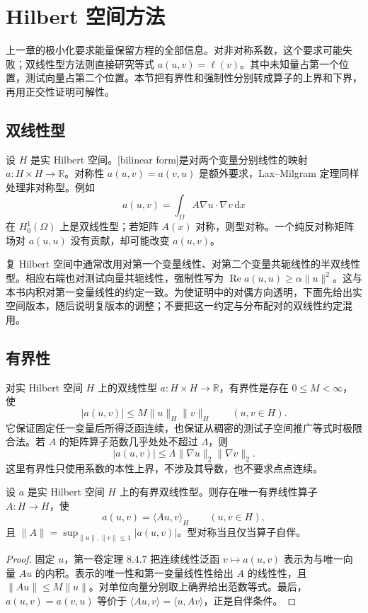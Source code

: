 \section{Hilbert 空间方法}
\label{b2:sec:1502}

上一章的极小化要求能量保留方程的全部信息。对非对称系数，这个要求可能失败；双线性型方法则直接研究等式 \(a(u,v)=\ell(v)\)。其中未知量占第一个位置，测试向量占第二个位置。本节把有界性和强制性分别转成算子的上界和下界，再用正交性证明可解性。

\subsection{双线性型}
\label{b2:subsec:150201}

设 \(H\) 是实 Hilbert 空间。[bilinear form]是对两个变量分别线性的映射 \(a:H\times H\to\mathbb R\)。对称性 \(a(u,v)=a(v,u)\) 是额外要求，Lax--Milgram 定理同样处理非对称型。例如
\[a(u,v)=\int_\Omega A\nabla u\cdot\nabla v\,\mathrm dx\]
在 \(H_0^1(\Omega)\) 上是双线性型；若矩阵 \(A(x)\) 对称，则型对称。一个纯反对称矩阵场对 \(a(u,u)\) 没有贡献，却可能改变 \(a(u,v)\)。

\ProseParagraphBreak

复 Hilbert 空间中通常改用对第一个变量线性、对第二个变量共轭线性的半双线性型。相应右端也对测试向量共轭线性，强制性写为 \(\operatorname{Re}a(u,u)\ge\alpha\lVert u\rVert^2\)。这与本书内积对第一变量线性的约定一致。为使证明中的对偶方向透明，下面先给出实空间版本，随后说明复版本的调整；不要把这一约定与分布配对的双线性约定混用。

\subsection{有界性}
\label{b2:subsec:150202}

对实 Hilbert 空间 \(H\) 上的双线性型 \(a:H\times H\to\mathbb R\)，有界性是存在 \(0\le M<\infty\)，使
\[|a(u,v)|\le M\lVert u\rVert_H\lVert v\rVert_H\qquad(u,v\in H).\]
它保证固定任一变量后所得泛函连续，也保证从稠密的测试子空间推广等式时极限合法。若 \(A\) 的矩阵算子范数几乎处处不超过 \(\Lambda\)，则
\[|a(u,v)|\le\Lambda\lVert\nabla u\rVert_2\lVert\nabla v\rVert_2.\]
这里有界性只使用系数的本性上界，不涉及其导数，也不要求点点连续。

\begin{proposition}[有界型的算子表示]
\label{b2:prop:15-form-operator}
设 \(a\) 是实 Hilbert 空间 \(H\) 上的有界双线性型。则存在唯一有界线性算子 \(A:H\to H\)，使
\[a(u,v)=\langle Au,v\rangle_H\qquad(u,v\in H),\]
且 \(\lVert A\rVert=\sup_{\lVert u\rVert,\lVert v\rVert\le1}|a(u,v)|\)。型对称当且仅当算子自伴。
\end{proposition}
\begin{proof}
固定 \(u\)，第一卷定理 8.4.7 把连续线性泛函 \(v\mapsto a(u,v)\) 表示为与唯一向量 \(Au\) 的内积。表示的唯一性和第一变量线性性给出 \(A\) 的线性性，且 \(\lVert Au\rVert\le M\lVert u\rVert\)。对单位向量分别取上确界给出范数等式。最后，\(a(u,v)=a(v,u)\) 等价于 \(\langle Au,v\rangle=\langle u,Av\rangle\)，正是自伴条件。
\end{proof}

